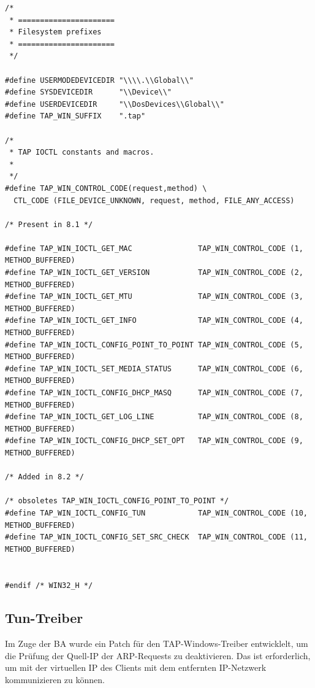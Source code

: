 \begin{lstlisting}[caption=Code von win32.h]
/*
 * ======================
 * Filesystem prefixes
 * ======================
 */

#define USERMODEDEVICEDIR "\\\\.\\Global\\"
#define SYSDEVICEDIR      "\\Device\\"
#define USERDEVICEDIR     "\\DosDevices\\Global\\"
#define TAP_WIN_SUFFIX    ".tap"

/*
 * TAP IOCTL constants and macros.
 *
 */
#define TAP_WIN_CONTROL_CODE(request,method) \
  CTL_CODE (FILE_DEVICE_UNKNOWN, request, method, FILE_ANY_ACCESS)

/* Present in 8.1 */

#define TAP_WIN_IOCTL_GET_MAC               TAP_WIN_CONTROL_CODE (1, METHOD_BUFFERED)
#define TAP_WIN_IOCTL_GET_VERSION           TAP_WIN_CONTROL_CODE (2, METHOD_BUFFERED)
#define TAP_WIN_IOCTL_GET_MTU               TAP_WIN_CONTROL_CODE (3, METHOD_BUFFERED)
#define TAP_WIN_IOCTL_GET_INFO              TAP_WIN_CONTROL_CODE (4, METHOD_BUFFERED)
#define TAP_WIN_IOCTL_CONFIG_POINT_TO_POINT TAP_WIN_CONTROL_CODE (5, METHOD_BUFFERED)
#define TAP_WIN_IOCTL_SET_MEDIA_STATUS      TAP_WIN_CONTROL_CODE (6, METHOD_BUFFERED)
#define TAP_WIN_IOCTL_CONFIG_DHCP_MASQ      TAP_WIN_CONTROL_CODE (7, METHOD_BUFFERED)
#define TAP_WIN_IOCTL_GET_LOG_LINE          TAP_WIN_CONTROL_CODE (8, METHOD_BUFFERED)
#define TAP_WIN_IOCTL_CONFIG_DHCP_SET_OPT   TAP_WIN_CONTROL_CODE (9, METHOD_BUFFERED)

/* Added in 8.2 */

/* obsoletes TAP_WIN_IOCTL_CONFIG_POINT_TO_POINT */
#define TAP_WIN_IOCTL_CONFIG_TUN            TAP_WIN_CONTROL_CODE (10, METHOD_BUFFERED)
#define TAP_WIN_IOCTL_CONFIG_SET_SRC_CHECK  TAP_WIN_CONTROL_CODE (11, METHOD_BUFFERED)


#endif /* WIN32_H */
\end{lstlisting}

\subsection{Tun-Treiber}
Im Zuge der \ac{BA} wurde ein Patch für den TAP-Windows-Treiber entwicklelt, um die
Prüfung der Quell-IP der ARP-Requests zu deaktivieren. Das ist erforderlich, um mit der
virtuellen IP des Clients mit dem entfernten IP-Netzwerk kommunizieren zu können.
